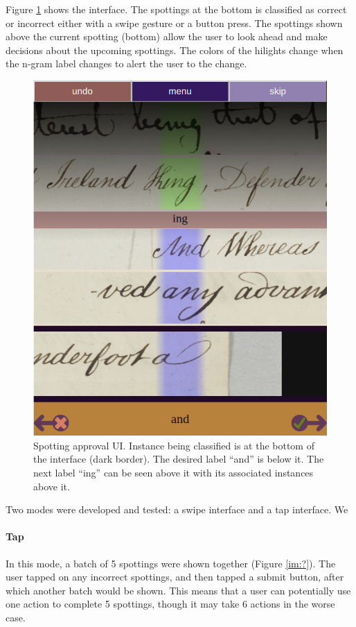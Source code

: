 \documentclass[ms,electronic,twosidetoc,letterpaper,chaptercenter,parttop,lol,lof,lot]{byumsphd}
\begin{document}
Figure \ref{fig:spottingapproval} shows the interface. The spottings at the bottom is classified as correct or incorrect either with a swipe gesture or a button press. The spottings shown above the current spotting (bottom) allow the user to look ahead and make decisions about the upcoming spottings. The colors of the hilights change when the n-gram label changes to alert the user to the change.

\begin{figure}
    \centering
    \includegraphics[width=.75\textwidth]{spottingapproval}
    \caption{Spotting approval UI. Instance being classified is at the bottom of the interface (dark border). The desired label ``and'' is below it. The next label ``ing'' can be seen above it with its associated instances above it.
    }
    \label{fig:spottingapproval}
\end{figure}

\iffalse
Two modes were developed and tested: a swipe interface and a tap interface. We

\paragraph{Tap}
In this mode, a batch of 5 spottings were shown together (Figure \ref{im:?}). The user tapped on any incorrect spottings, and then tapped a submit button, after which another batch would be shown. This means that a user can potentially use one action to complete 5 spottings, though it may take 6 actions in the worse case.
\end{document}
